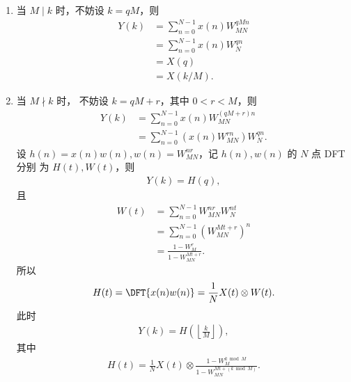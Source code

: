 \begin{solution}
\begin{enumerate}[label=(\arabic*)]
            \begin{enumerate}
                \item 当 $M \mid k$ 时，不妨设 $k = qM$，则
                    \begin{align*}
                        Y(k) & = \sum_{n = 0}^{N - 1}x(n)W_{MN}^{qMn} \\
                        & = \sum_{n = 0}^{N - 1}x(n)W_N^{qn} \\
                        & = X(q) \\
                        & = X(k / M).
                    \end{align*}
                \item 当 $M \nmid k$ 时， 不妨设 $k = qM + r$，其中 $0 < r < M$，则
                    \begin{align*}
                        Y(k) & = \sum_{n = 0}^{N - 1}x(n)W_{MN}^{(qM + r)n} \\
                        & = \sum_{n = 0}^{N - 1}\left(x(n)W_{MN}^{rn}\right)W_N^{qn}.
                    \end{align*}
                    设 $h(n) = x(n)w(n), w(n) = W_{MN}^{nr}$，记 $h(n), w(n)$ 的 $N$ 点 DFT 分别
                    为 $H(t), W(t)$，则
                    \begin{align*}
                        Y(k) = H(q),
                    \end{align*}
                    且
                    \begin{align*}
                        W(t) & = \sum_{n = 0}^{N - 1}W_{MN}^{nr}W_N^{nt} \\
                        & = \sum_{n = 0}^{N - 1}\left(W_{MN}^{Mt+r}\right)^n \\
                        & = \frac{1 - W_M^r}{1 - W_{MN}^{Mt+r}}.
                    \end{align*}
                    所以
                    \begin{align*}
                        H(t) = \DFT{x(n)w(n)} = \frac{1}{N}X(t) \otimes W(t).
                    \end{align*}
                    此时
                    \begin{align*}
                        Y(k) = H\left(\left\lfloor\frac{k}{M}\right\rfloor\right),
                    \end{align*}
                    其中
                    \begin{align*}
                        H(t) = \frac{1}{N}X(t) \otimes \frac{1 - W_M^{k \bmod M}}{1 - W_{MN}^{Mt + (k\bmod M)}}.

\end{align*}
\end{enumerate}
\end{enumerate}
\end{solution}
